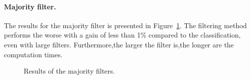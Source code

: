 \paragraph{Majority filter. \\}
The results for the majority filter is presented in Figure~\ref{fig:C3_S3_ss4_maj}.  The filtering method performs the worse with a gain of less than 1\% compared to the classification, even with large filters. Furthermore,the larger the filter is,the longer are the computation times. 

\begin{figure}[htbp]
\begin{center}
\begingroup
\captionsetup[subfigure]{width=0.3\textwidth}
\hspace*{0.025\textwidth}
\hspace*{0.025\textwidth}
\endgroup
\caption{Results of the majority filters.}
\label{fig:C3_S3_ss4_maj}
\end{center}
\end{figure}

